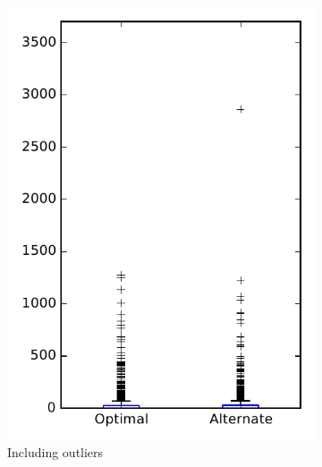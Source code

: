 
\begin{figure}
    \centering
    \begin{subfigure}{.4\textwidth}
        \centering
        \includegraphics[height=0.4\textheight]{figures/combo/flt_rq1_overview}
        \caption{Including outliers}\label{fig:combo:flt:rq1:overview_outlier}
    \end{subfigure}%
    \begin{subfigure}{.4\textwidth}
        \centering

\end{subfigure}
\end{figure}
